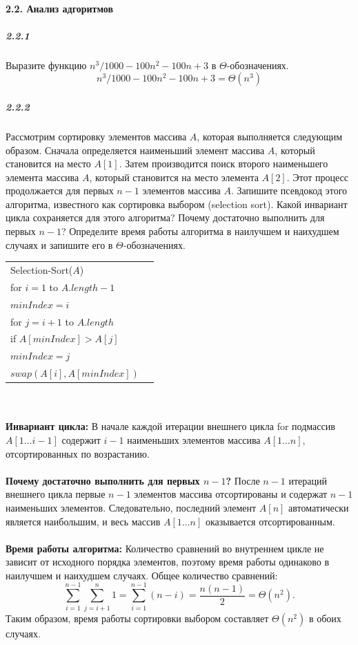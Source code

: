\paragraph{2.2. Анализ адгоритмов}
\subparagraph{2.2.1}
Выразите функцию $n^3/1000 - 100n^2 - 100n + 3$ в $\Theta$-обозначениях.
$$n^3/1000 - 100n^2 - 100n + 3 = \Theta(n^3)$$

\subparagraph{2.2.2}
Рассмотрим сортировку элементов массива $A$, которая выполняется следующим образом. 
Сначала определяется наименьший элемент массива $A$, который становится на место $A[1]$. 
Затем производится поиск второго наименьшего элемента массива $A$, который становится на место элемента $A[2]$.
Этот процесс продолжается для первых $n-1$ элементов массива $A$.
Запишите псевдокод этого алгоритма, известного как сортировка выбором (selection sort).
Какой инвариант цикла сохраняется для этого алгоритма? 
Почему достаточно выполнить для первых $n-1$?
Определите время работы алгоритма в наилучшем и наихудшем случаях и запишите его в $\Theta$-обозначениях. \\

\begin{tabular}{ll}
Selection-Sort($A$) & \\
\quad for $i = 1$ to $A.length - 1$ & \\
\quad \quad $minIndex = i$ & \\ 
\quad \quad for $j = i + 1$ to $A.length$ & \\
\quad \quad \quad if $A[minIndex] > A[j]$& \\
\quad \quad \quad \quad $minIndex = j$& \\
\quad \quad $swap(A[i], A[minIndex])$ &\\
\end{tabular} \\
\\
\textbf{Инвариант цикла:}
В начале каждой итерации внешнего цикла for подмассив $A[1 \ldots i-1]$ содержит $i-1$ наименьших элементов массива $A[1 \ldots n]$, отсортированных по возрастанию. \\
\\
\textbf{Почему достаточно выполнить для первых $n-1$?}
После $n-1$ итераций внешнего цикла первые $n-1$ элементов массива отсортированы и содержат $n-1$ наименьших элементов.
Следовательно, последний элемент $A[n]$ автоматически является наибольшим, и весь массив $A[1 \ldots n]$ оказывается отсортированным.\\
\\
\textbf{Время работы алгоритма:}
Количество сравнений во внутреннем цикле не зависит от исходного порядка элементов, поэтому время работы одинаково в наилучшем и наихудшем случаях. 
Общее количество сравнений:
\[
\sum_{i=1}^{n-1} \sum_{j=i+1}^{n} 1 = \sum_{i=1}^{n-1} (n-i) = \frac{n(n-1)}{2} = \Theta(n^2).
\]
Таким образом, время работы сортировки выбором составляет $\Theta(n^2)$ в обоих случаях.

